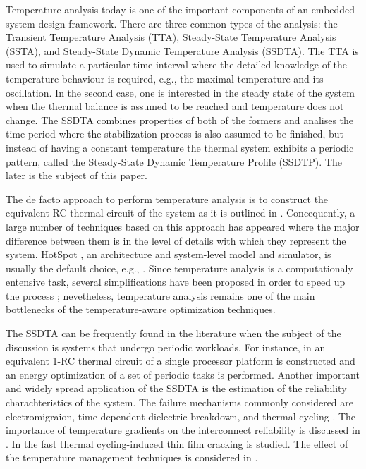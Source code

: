 Temperature analysis today is one of the important components of an embedded system design framework. There are three common types of the analysis: the Transient Temperature Analysis (TTA), Steady-State Temperature Analysis (SSTA), and Steady-State Dynamic Temperature Analysis (SSDTA). The TTA is used to simulate a particular time interval where the detailed knowledge of the temperature behaviour is required, e.g., the maximal temperature and its oscillation. In the second case, one is interested in the steady state of the system when the thermal balance is assumed to be reached and temperature does not change. The SSDTA combines properties of both of the formers and analises the time period where the stabilization process is also assumed to be finished, but instead of having a constant temperature the thermal system exhibits a periodic pattern, called the Steady-State Dynamic Temperature Profile (SSDTP). The later is the subject of this paper.

The de facto approach to perform temperature analysis is to construct the equivalent RC thermal circuit \cite{kreith2000} of the system as it is outlined in . Concequently, a large number of techniques based on this approach has appeared where the major difference between them is in the level of details with which they represent the system. HotSpot \cite{huang2006}, an architecture and system-level model and simulator, is usually the default choice, e.g., \cite{lu2004, srinivasan2004, liao2005, coskun2006, liu2007, huang2009, xiang2010, thiele2011}. Since temperature analysis is a computationaly entensive task, several simplifications have been proposed in order to speed up the process \cite{rao2007, hanumaiah2009}; nevetheless, temperature analysis remains one of the main bottlenecks of the temperature-aware optimization techniques.

The SSDTA can be frequently found in the literature when the subject of the discussion is systems that undergo periodic workloads. For instance, in \cite{bao2010} an equivalent 1-RC thermal circuit of a single processor platform is constructed and an energy optimization of a set of periodic tasks is performed. Another important and widely spread application of the SSDTA is the estimation of the reliability charachteristics of the system. The failure mechanisms commonly considered are electromigraion, time dependent dielectric breakdown, and thermal cycling \cite{jedec2010}. The importance of temperature gradients on the interconnect reliability is discussed in \cite{lu2004}. In \cite{hieu2004} the fast thermal cycling-induced thin film cracking is studied. The effect of the temperature management techniques is considered in \cite{srinivasan2004}.

